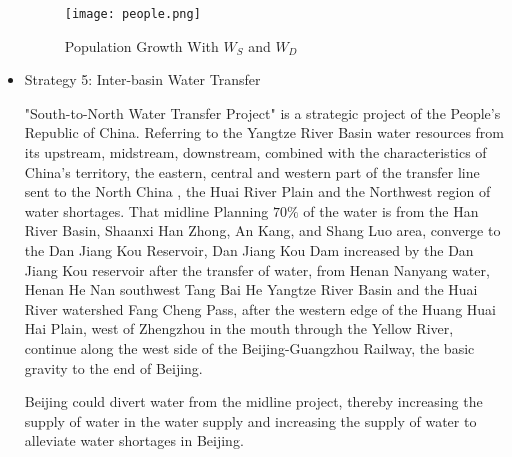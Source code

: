 \documentclass{mcmthesis}
\begin{document}
\begin{itemize}
		\begin{figure}[h]
		\small
		\centering
		\texttt{[image: people.png]}
		\caption{Population Growth With $W_S$ and $W_D$} \label{fig:Population Growth With $W_S$ and $W_D$}
		\end{figure}
		
	\item Strategy 5: Inter-basin Water Transfer
		
	\par "South-to-North Water Transfer Project" is a strategic project of the People's Republic of China. Referring to the Yangtze River Basin water resources from its upstream, midstream, downstream, combined with the characteristics of China's territory, the eastern, central and western part of the transfer line sent to the North China , the Huai River Plain and the Northwest region of water shortages. That midline Planning $70\%$ of the water is from the Han River Basin, Shaanxi Han Zhong, An Kang, and Shang Luo area, converge to the Dan Jiang Kou Reservoir, Dan Jiang Kou Dam increased by the Dan Jiang Kou reservoir after the transfer of water, from Henan Nanyang water, Henan He Nan southwest Tang Bai He Yangtze River Basin and the Huai River watershed Fang Cheng Pass, after the western edge of the Huang Huai Hai Plain, west of Zhengzhou in the mouth through the Yellow River, continue along the west side of the Beijing-Guangzhou Railway, the basic gravity to the end of Beijing.
	
	\par Beijing could divert water from the midline project, thereby increasing the supply of water in the water supply and increasing the supply of water to alleviate water shortages in Beijing.
\end{itemize}
\end{document}
